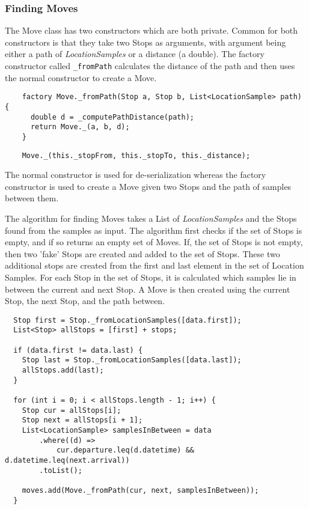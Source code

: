 \subsubsection*{Finding Moves}
The Move class has two constructors which are both private. Common for both constructors is that they take two Stops as arguments, with argument being either a path of \textit{LocationSamples} or a distance (a double). The factory constructor called \verb|_fromPath| calculates the distance of the path and then uses the normal constructor to create a Move. 
\begin{verbatim}
    factory Move._fromPath(Stop a, Stop b, List<LocationSample> path) {
      double d = _computePathDistance(path);
      return Move._(a, b, d);
    }
\end{verbatim}

\begin{verbatim}
    Move._(this._stopFrom, this._stopTo, this._distance);
\end{verbatim}
The normal constructor is used for de-serialization whereas the factory constructor is used to create a Move given two Stops and the path of samples between them.

The algorithm for finding Moves takes a List of \textit{LocationSamples} and the Stops found from the samples as input. The algorithm first checks if the set of Stops is empty, and if so returns an empty set of Moves. If, the set of Stops is not empty, then two 'fake' Stops are created and added to the set of Stops. These two additional stops are created from the first and last element in the set of Location Samples. For each Stop in the set of Stops, it is calculated which samples lie in between the current and next Stop. A Move is then created using the current Stop, the next Stop, and the path between. 

\begin{verbatim}
  Stop first = Stop._fromLocationSamples([data.first]);
  List<Stop> allStops = [first] + stops;

  if (data.first != data.last) {
    Stop last = Stop._fromLocationSamples([data.last]);
    allStops.add(last);
  }

  for (int i = 0; i < allStops.length - 1; i++) {
    Stop cur = allStops[i];
    Stop next = allStops[i + 1];
    List<LocationSample> samplesInBetween = data
        .where((d) =>
            cur.departure.leq(d.datetime) && d.datetime.leq(next.arrival))
        .toList();

    moves.add(Move._fromPath(cur, next, samplesInBetween));
  }
\end{verbatim}

